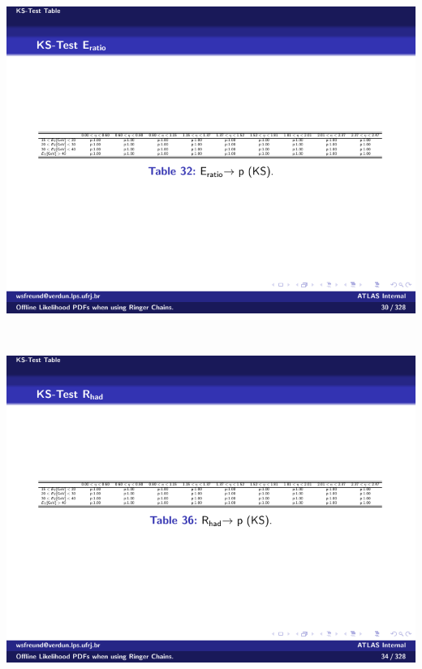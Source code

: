 \begin{table}[b]
\begin{subtable}{\textwidth}
\end{subtable} \\
\begin{subtable}{\textwidth}
\caption{\eratio{}\label{tab:gof_ks_p_values_eratio}}
\includegraphics[width=\textwidth]{appendices/figures/gof/eratio_ks_table.pdf}
\end{subtable} \\
\begin{subtable}{\textwidth}
\caption{\rhad{}\label{tab:gof_ks_p_values_rhad}}
\includegraphics[width=\textwidth]{appendices/figures/gof/rhad_ks_table.pdf}
\end{subtable} \\
\begin{subtable}{\textwidth}

\end{subtable}
\end{table}
